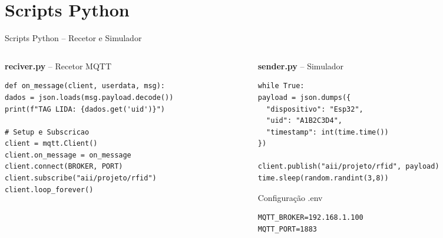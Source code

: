 \documentclass[aspectratio=169, 12pt]{beamer}
\begin{document}
  \section{Scripts Python}
  \begin{frame}[fragile]{Scripts Python -- Recetor e Simulador}
    \begin{columns}[T]
      \begin{column}{0.49\textwidth}
        {\color{azulP}\textbf{reciver.py}} -- Recetor MQTT
        \begin{lstlisting}[style=python]
def on_message(client, userdata, msg):
dados = json.loads(msg.payload.decode())
print(f"TAG LIDA: {dados.get('uid')}")

# Setup e Subscricao
client = mqtt.Client()
client.on_message = on_message
client.connect(BROKER, PORT)
client.subscribe("aii/projeto/rfid")
client.loop_forever()
        \end{lstlisting}
      \end{column}
      \begin{column}{0.49\textwidth}
        {\color{laranja}\textbf{sender.py}} -- Simulador
        \begin{lstlisting}[style=python]
while True:
payload = json.dumps({
  "dispositivo": "Esp32",
  "uid": "A1B2C3D4",
  "timestamp": int(time.time())
})

client.publish("aii/projeto/rfid", payload)
time.sleep(random.randint(3,8))      
        \end{lstlisting}
        \vspace{0.2em}
        \begin{exampleblock}{Configura\c{c}\~{a}o .env}
          \begin{lstlisting}[style=bash]
MQTT_BROKER=192.168.1.100
MQTT_PORT=1883
          \end{lstlisting}
        \end{exampleblock}
      \end{column}
    \end{columns}
  \end{frame}

\end{document}
